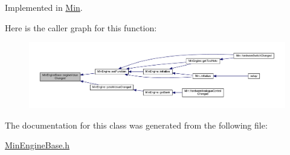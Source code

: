 Implemented in \hyperlink{class_min_a9fe42a8d40c06d73556cf6d0dac2dc71}{Min}.

Here is the caller graph for this function\+:
\nopagebreak
\begin{figure}[H]
\begin{center}
\leavevmode
\includegraphics[width=350pt]{d7/d0e/class_min_engine_base_a35b19eb25b2bbfbcf0bc2262a63ec488_icgraph}
\end{center}
\end{figure}


The documentation for this class was generated from the following file\+:\begin{DoxyCompactItemize}
\item 
\hyperlink{_min_engine_base_8h}{Min\+Engine\+Base.\+h}\end{DoxyCompactItemize}
